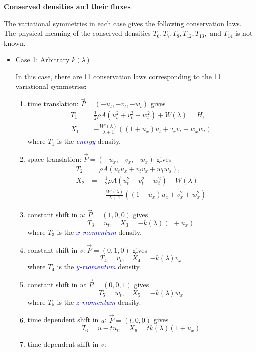\documentclass[landscape]{slides}
\def\myemph#1{\textcolor{blue}{\em #1}}
\begin{document}
\newpage

\begin{center}
\textbf{Conserved densities and their fluxes}
\end{center}

The variational symmetries in each case gives the following conservation laws. 
The physical meaning of the conserved densities $T_6, T_7, T_8, T_{12}, T_{13}, \text{ and } T_{14}$ is not known.

\begin{itemize}
\item
Case 1: Arbitrary $k(\lambda)$

In this case, there are 11 conservation laws corresponding to the 11 variational symmetries:
\begin{enumerate}[label=\roman*.]
\item 
time translation: $\vec{P} = (-u_t, -v_t, -w_t)$ gives 
\[\begin{aligned} 
T_1 &= \frac{1}{2} \rho A (u_t^2 + v_t^2 + w_t^2) + W(\lambda) = H, \\
X_1 &= - \frac{W'(\lambda)}{\lambda + 1} 
(
(1 + u_x) u_t + v_x v_t + w_x w_t
)
\end{aligned}\]
where $T_1$ is the \myemph{energy} density.
\item 
space translation: $\vec{P} = (-u_x, -v_x, -w_x)$ gives 
\[\begin{aligned}
T_2 &= \rho A (u_t u_x + v_t v_x + w_t w_x), \\
X_2 &= -\frac{1}{2} \rho A (u_t^2 + v_t^2 + w_t^2)
+ W(\lambda) \\
& \quad - \frac{W'(\lambda)}{\lambda + 1} 
(
(1 + u_x) u_x + v_x^2 + w_x^2
)
\end{aligned}\]
\item 
constant shift in $u$:
$\vec{P} =(1,0,0)$ 
gives 
\[
T_3 = u_t,
\quad 
X_3 = -k(\lambda) (1 + u_x)      
\]
where $T_3$ is the \myemph{$x$-momentum} density.
\item 
constant shift in $v$:
$\vec{P} =(0,1,0)$ 
gives
\[
T_4 = v_t,
\quad 
X_4 = -k(\lambda) v_x     
\]
where $T_4$ is the \myemph{$y$-momentum} density.
\item 
constant shift in $w$: 
$\vec{P} =(0,0,1)$ 
gives
\[
T_5 = w_t,
\quad 
X_5 = -k(\lambda) w_x     
\]
where $T_5$ is the \myemph{$z$-momentum} density.
\item 
time dependent shift in $u$: 
$\vec{P} =(t,0,0)$ 
gives 
\[
T_6 = u - t u_t,
\quad
X_6 =  t k(\lambda) (1 + u_x)
\]
\item 
time dependent shift in $v$: 

\end{enumerate}
\end{itemize}
\end{document}
